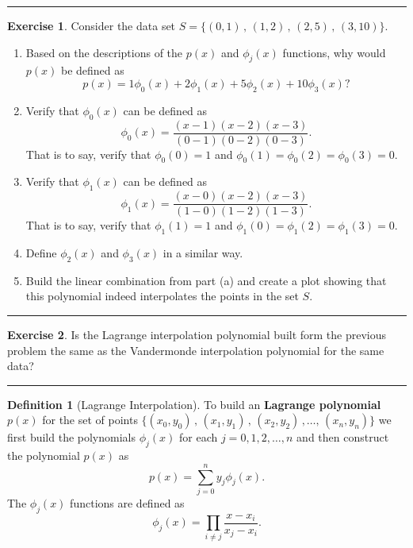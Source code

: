 \documentclass[
]{book}
\theoremstyle{definition}
\newtheorem{definition}{Definition}[chapter]
\theoremstyle{definition}
\theoremstyle{definition}
\newtheorem{exercise}{Exercise}[chapter]
\theoremstyle{remark}
\begin{document}
\begin{center}\rule{0.5\linewidth}{0.5pt}\end{center}

\begin{exercise}
\protect\hypertarget{exr:unnamed-chunk-844}{}{\label{exr:unnamed-chunk-844} }Consider the data set
\(S = \{(0,1) \, , \, (1,2) \, , \, (2,5) \, , \, (3,10) \}\).

\begin{enumerate}
\def\labelenumi{\alph{enumi}.}
\item
  Based on the descriptions of the \(p(x)\) and \(\phi_j(x)\) functions,
  why would \(p(x)\) be defined as
  \[p(x) = 1 \phi_0(x) + 2 \phi_1(x) + 5 \phi_2(x) + 10 \phi_3(x)?\]
\item
  Verify that \(\phi_0(x)\) can be defined as
  \[\phi_0(x) = \frac{(x-1)(x-2)(x-3)}{(0-1)(0-2)(0-3)}.\]
  That is to say, verify that \(\phi_0(0) = 1\) and \(\phi_0(1) = \phi_0(2) = \phi_0(3) = 0\).
\item
  Verify that \(\phi_1(x)\) can be defined as
  \[\phi_1(x) = \frac{(x-0)(x-2)(x-3)}{(1-0)(1-2)(1-3)}.\]
  That is to say, verify that \(\phi_1(1) = 1\) and \(\phi_1(0) = \phi_1(2) = \phi_1(3) = 0\).
\item
  Define \(\phi_2(x)\) and \(\phi_3(x)\) in a similar way.
\item
  Build the linear combination from part (a) and create a plot showing
  that this polynomial indeed interpolates the points in the set \(S\).
\end{enumerate}
\end{exercise}

\begin{center}\rule{0.5\linewidth}{0.5pt}\end{center}

\begin{exercise}
\protect\hypertarget{exr:unnamed-chunk-845}{}{\label{exr:unnamed-chunk-845} }Is the Lagrange interpolation polynomial built form the previous problem the same as the Vandermonde interpolation polynomial for the same data?
\end{exercise}

\begin{center}\rule{0.5\linewidth}{0.5pt}\end{center}

\begin{definition}[Lagrange Interpolation]
\protect\hypertarget{def:unnamed-chunk-846}{}{\label{def:unnamed-chunk-846} {} }To build an \textbf{Lagrange polynomial} \(p(x)\) for the set of points
\(\{(x_0,y_0)\,,\,(x_1,y_1)\,,\,(x_2,y_2)\,,\ldots,\,(x_n,y_n)\}\) we
first build the polynomials \(\phi_j(x)\) for each
\(j = 0, 1, 2, \ldots, n\) and then construct the polynomial \(p(x)\) as
\[p(x) = \sum_{j=0}^n y_j \phi_j(x).\] The \(\phi_j(x)\) functions are
defined as \[\phi_j(x) = \prod_{i \ne j} \frac{x-x_i}{x_j-x_i}.\]
\end{definition}
\end{document}

